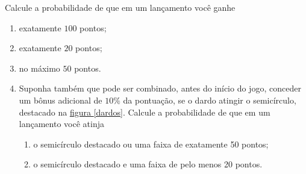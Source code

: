 \documentclass[10 pt,usenames,dvipsnames, oneside]{article}
\begin{document}
Calcule a probabilidade de que em um lançamento você ganhe
\begin{enumerate}
\item {} 
exatamente $100$ pontos;

\item {} 
exatamente $20$ pontos;

\item {} 
no máximo $50$ pontos.

\item {} 
Suponha também que pode ser combinado, antes do início do jogo, conceder um bônus adicional de $10\%$ da pontuação, se o dardo atingir o semicírculo, destacado na \hyperref[dardos]{figura \ref{dardos}}. Calcule a probabilidade de que em um lançamento você atinja
\begin{enumerate}
\item {} 
o semicírculo destacado ou uma faixa de exatamente 50 pontos;

\item {} 
o semicírculo destacado e uma faixa de pelo menos 20 pontos.

\end{enumerate}

\end{enumerate}
\end{document}
